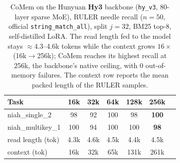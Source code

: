 \begin{table}[t]
\centering
\small
\begin{tabular}{@{}lcccccc@{}}
\toprule
\textbf{Task} & 16k & 32k & 64k & 128k & 256k \\
\midrule
niah\_single\_2   &  98 & 92 & 100 &  98 & \textbf{100} \\
niah\_multikey\_1 & 100 & 94 & 100 & 100 & \textbf{98} \\
\midrule
read length (tok) & 4.3k & 4.6k & 4.5k & 4.4k & 4.5k \\
context (tok)     & 16k  & 32k  & 65k  & 131k & 261k \\
\bottomrule
\end{tabular}
\caption{CoMem on the Hunyuan \textbf{Hy3} backbone (\texttt{hy\_v3},
80-layer sparse MoE), RULER needle recall ($n{=}50$, official
\texttt{string\_match\_all}), split $j{=}32$, BM25 top-$8$, self-distilled LoRA.
The read length fed to the model stays $\approx$4.3--4.6k tokens while the
context grows $16\times$ (16k$\to$256k); CoMem reaches its highest recall at 256k,
the backbone's native ceiling, with $0$ out-of-memory failures. The
context row reports the mean packed length of the RULER samples.}
\label{tab:hy3ruler}
\end{table}

